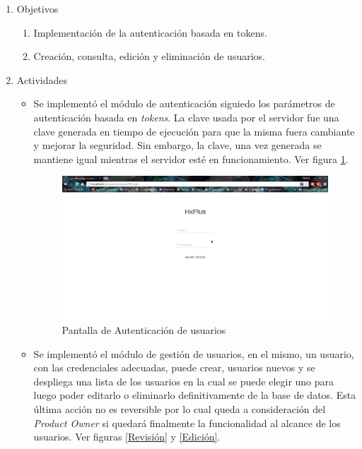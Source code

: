     \begin{enumerate}
        \item Objetivos
        \begin{enumerate}
            \item Implementación de la autenticación basada en tokens.
            \item Creación, consulta, edición y eliminación de usuarios.
        \end{enumerate}
        \item Actividades
        \begin{itemize}
            \item Se implementó el módulo de autenticación siguiedo los parámetros de autenticación basada en \textit{tokens}. La clave usada por el servidor fue una clave generada en tiempo de ejecución para que la misma fuera cambiante y mejorar la seguridad. Sin embargo, la clave, una vez generada se mantiene igual mientras el servidor esté en funcionamiento. Ver figura \ref{Autenticación}.
            
            \begin{figure}[htbp!]
                \begin{center}
                    \includegraphics[width=.8\textwidth]{figures/p1}
                \end{center}
                \caption{Pantalla de Autenticación de usuarios}
                \label{Autenticación}
            \end{figure}
            
            \item Se implementó el módulo de gestión de usuarios, en el mismo, un usuario, con las credenciales adecuadas, puede crear, usuarios nuevos y se despliega una lista de los usuarios en la  cual se puede elegir uno para luego poder editarlo o eliminarlo definitivamente de la base de datos. Esta última acción no es reversible por lo cual queda a consideración del \textit{Product Owner} si quedará finalmente la funcionalidad al alcance de los usuarios. Ver figuras \ref{Revisión} y \ref{Edición}.
            

\end{itemize}
\end{enumerate}
